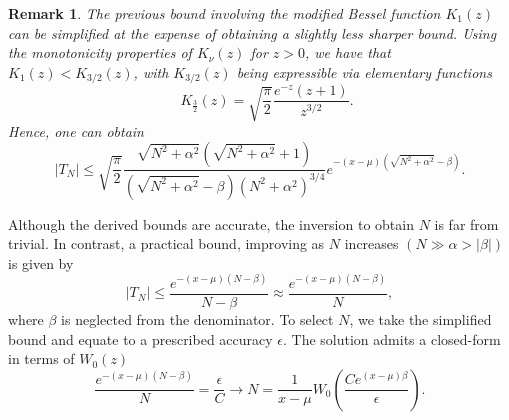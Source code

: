 \documentclass[10pt,a4paper,oneside]{article}
\newtheorem{remark}[theorem]{Remark}
\numberwithin{equation}{section}
\begin{document}
\begin{remark}The previous bound involving the modified Bessel function $K_1(z)$ can be simplified at the expense of obtaining a slightly less sharper bound. Using the monotonicity properties of $K_{\nu}(z)$ for $z > 0$, we have that $K_1(z) < K_{3/2}(z)$, with $K_{3/2}(z)$ being expressible via elementary functions
\begin{equation*}
\quad K_{\frac{3}{2}}(z) = \sqrt{\frac{\pi}{2}}\frac{e^{-z} (z+1)}{z^{3/2}}.
\end{equation*}
Hence, one can obtain
\begin{equation}
|T_N| \le \sqrt{\frac{\pi}{2}} \frac{\sqrt{N^2 + \alpha^2}(\sqrt{N^2 + \alpha^2} + 1)}{(\sqrt{N^2 + \alpha^2} - \beta)\left(N^2 + \alpha^2\right)^{3/4}} e^{-(x-\mu)\left(\sqrt{N^2 + \alpha^2} - \beta\right)}.
\end{equation}
\end{remark}
Although the derived bounds are accurate, the inversion to obtain $N$ is far from trivial. In contrast, a practical bound, improving as $N$ increases $(N \gg \alpha > |\beta|)$ is given by
\begin{equation}
|T_N| \le \frac{e^{-(x-\mu)(N - \beta)}}{N - \beta} \approx \frac{e^{-(x-\mu)(N-\beta)}}{N},
\end{equation}
where $\beta$ is neglected from the denominator. To select $N$, we take the simplified bound and equate to a prescribed accuracy $\epsilon$. The solution admits a closed-form in terms of $W_0(z)$
\begin{equation}
\frac{e^{-(x-\mu)(N-\beta)}}{N} = \frac{\epsilon}{C} \longrightarrow N = \frac{1}{x-\mu}W_0\left(\frac{C e^{(x-\mu)\beta}}{\epsilon}\right).
\end{equation}
\end{document}
